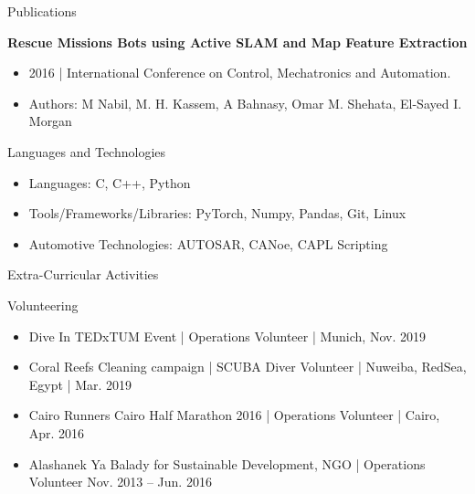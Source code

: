 \documentclass[]{mcdowellcv}
\begin{document}
	\begin{cvsection}{Publications}
		\begin{cvsubsection}{}{}{}
			\textbf{Rescue Missions Bots using Active SLAM and Map Feature Extraction}
			\begin{itemize}
				\item 2016 | International Conference on Control, Mechatronics and Automation.
				\item Authors: M Nabil,  M. H. Kassem, A Bahnasy, Omar M. Shehata, El-Sayed I. Morgan
			\end{itemize}
		\end{cvsubsection}
	\end{cvsection}
	
	\begin{cvsection}{Languages and Technologies}
		\begin{cvsubsection}{}{}{}	
			\begin{itemize}
				\item Languages: C, C++, Python
				\item Tools/Frameworks/Libraries: PyTorch, Numpy, Pandas, Git, Linux
				\item Automotive Technologies: AUTOSAR, CANoe, CAPL Scripting
			\end{itemize}
		\end{cvsubsection}
	\end{cvsection}
	
	\begin{cvsection}{Extra-Curricular Activities}
		\begin{cvsubsection}{Volunteering}{}{}	
			
			\begin{itemize}
				\item Dive In TEDxTUM Event | Operations Volunteer | Munich, Nov. 2019
				\item Coral Reefs Cleaning campaign | SCUBA Diver Volunteer | Nuweiba, RedSea, Egypt | Mar. 2019
				\item Cairo Runners Cairo Half Marathon 2016 | Operations Volunteer | Cairo, Apr. 2016
				\item Alashanek Ya Balady for Sustainable Development, NGO | Operations Volunteer  Nov. 2013 -- Jun. 2016
			\end{itemize}
		\end{cvsubsection}
	\end{cvsection}
	
	
\end{document}
